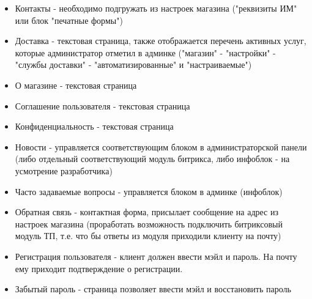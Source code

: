 \documentclass[DIV=calc, paper=a4, fontsize=11pt]{scrartcl} %
\begin{document}
\begin{itemize}
	\item Контакты - необходимо подгружать из настроек магазина ("реквизиты ИМ" или блок "печатные формы")
	\item Доставка - текстовая страница, также отображается перечень активных услуг, которые администратор отметил в админке ("магазин" - "настройки" - "службы доставки" - "автоматизированные" и "настраиваемые")
	\item О магазине - текстовая страница
	\item Соглашение пользователя - текстовая страница
	\item Конфиденциальность - текстовая страница
	\item Новости - управляется соответствующим блоком в администраторской панели (либо отдельный соответствующий модуль битрикса, либо инфоблок - на усмотрение разработчика)
	\item Часто задаваемые вопросы - управляется блоком в админке (инфоблок)
	\item Обратная связь - контактная форма, присылает сообщение на адрес из настроек магазина (проработать возможность подключить битриксовый модуль ТП, т.е. что бы ответы из модуля приходили клиенту на почту)
	\item Регистрация пользователя - клиент должен ввести мэйл и пароль. На почту ему приходит подтверждение о регистрации.
	\item Забытый пароль - страница позволяет ввести мэйл и восстановить пароль
\end{itemize}
\end{document}
